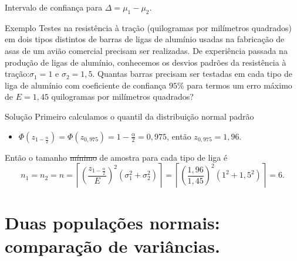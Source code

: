 \documentclass[9pt]{beamer}
\begin{document}
\begin{frame}{Intervalo de confiança para $\Delta = \mu_1-\mu_2$.}
\begin{block}{Exemplo}
	Testes na resistência à tração (quilogramas por milímetros quadrados) em dois tipos distintos de barras de ligas de alumínio usadas na fabricação de asas de um avião comercial precisam ser realizadas. De experiência passada na produção de ligas de alumínio, conhecemos os desvios padrões da resistência à tração:$\sigma_1 = 1$ e $\sigma_2=1,5$. Quantas barras precisam ser testadas em cada tipo de liga de alumínio com coeficiente de confiança $95\%$ para termos um erro máximo de $E=1,45$ quilogramas por milímetros quadrados?
\end{block}

\begin{block}{Solução}
	Primeiro calculamos o quantil da distribuição normal padrão
	\begin{itemize}
		\item $\Phi\left(z_{1-\frac{\alpha}{2}}\right) = \Phi\left(z_{0,975}\right) = 1-\frac{\alpha}{2} = 0,975$, então $z_{0,975} = 1,96$.
	\end{itemize}
	
	Então o tamanho \sout{mínimo} de amostra para cada tipo de liga é
	$$n_1 = n_2 = n = \left\lceil \left( \frac{z_{1-\frac{\alpha}{2}}}{E}\right)^2(\sigma_1^2 + \sigma_2^2) \right\rceil = \left\lceil \left( \frac{1,96}{1,45}\right)^2(1^2 + 1,5^2) \right\rceil=6.$$
\end{block}
\end{frame}

\section{Duas populações normais: comparação de variâncias.}
\end{document}
